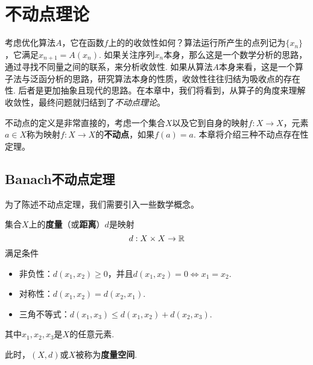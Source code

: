 \chapter{不动点理论}\label{chap:fixed-point-theory}

考虑优化算法$A$，它在函数$f$上的的收敛性如何？算法运行所产生的点列记为$\{x_n\}$，它满足$x_{n+1}=A(x_n)$. 如果关注序列$x_n$本身，那么这是一个数学分析的思路，通过寻找不同量之间的联系，来分析收敛性. 如果从算法$A$本身来看，这是一个算子法与泛函分析的思路，研究算法本身的性质，收敛性往往归结为吸收点的存在性. 后者是更加抽象且现代的思路。在本章中，我们将看到，从算子的角度来理解收敛性，最终问题就归结到了\emph{不动点理论}。

不动点的定义是非常直接的，考虑一个集合$X$以及它到自身的映射$f:X\to X$，元素$a\in X$称为映射$f:X\to X$的\textbf{不动点}，如果$f(a)=a$. 本章将介绍三种不动点存在性定理。

\section{Banach不动点定理}
为了陈述不动点定理，我们需要引入一些数学概念。

\begin{definition}[度量与度量空间]
集合$X$上的\textbf{度量}（或\textbf{距离}）$d$是映射
\[d:X\times X\to \mathbb{R}\]
满足条件
\begin{itemize}
\item 非负性：$d(x_1,x_2)\geq 0$，并且$d(x_1,x_2)=0\iff x_1=x_2$.
\item 对称性：$d(x_1,x_2)=d(x_2,x_1)$.
\item 三角不等式：$d(x_1,x_3)\le d(x_1,x_2)+d(x_2,x_3)$.
\end{itemize}
其中$x_1,x_2,x_3$是$X$的任意元素. 

此时，$(X,d)$或$X$被称为\textbf{度量空间}.
\end{definition}

